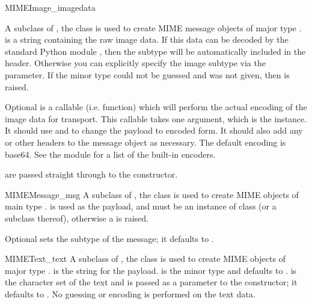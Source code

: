 \begin{classdesc}{MIMEImage}{_imagedata}

A subclass of , the  class is
used to create MIME message objects of major type .
 is a string containing the raw image data.  If this
data can be decoded by the standard Python module ,
then the subtype will be automatically included in the
 header.  Otherwise you can explicitly specify the
image subtype via the  parameter.  If the minor type could
not be guessed and  was not given, then 
is raised.

Optional  is a callable (i.e. function) which will
perform the actual encoding of the image data for transport.  This
callable takes one argument, which is the  instance.
It should use  and  to
change the payload to encoded form.  It should also add any
 or other headers to the message
object as necessary.  The default encoding is base64.  See the
 module for a list of the built-in encoders.

 are passed straight through to the 
constructor.
\end{classdesc}

\begin{classdesc}{MIMEMessage}{_msg}
A subclass of , the  class
is used to create MIME objects of main type .
 is used as the payload, and must be an instance of class
 (or a subclass thereof), otherwise a
 is raised.

Optional  sets the subtype of the message; it defaults
to .
\end{classdesc}

\begin{classdesc}{MIMEText}{_text}
A subclass of , the  class is
used to create MIME objects of major type .
 is the string for the payload.   is the
minor type and defaults to .   is the
character set of the text and is passed as a parameter to the
 constructor; it defaults to .  No
guessing or encoding is performed on the text data.

\end{classdesc}
